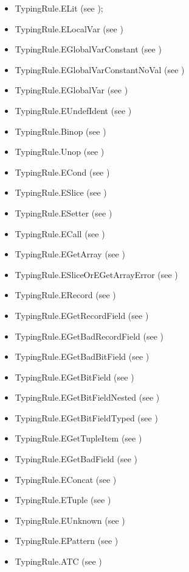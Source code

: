 \begin{itemize}
\item TypingRule.ELit (see );
\item TypingRule.ELocalVar (see )
\item TypingRule.EGlobalVarConstant (see )
\item TypingRule.EGlobalVarConstantNoVal (see )
\item TypingRule.EGlobalVar (see )
\item TypingRule.EUndefIdent (see )
\item TypingRule.Binop (see )
\item TypingRule.Unop (see )
\item TypingRule.ECond (see )
\item TypingRule.ESlice (see )
\item TypingRule.ESetter (see )
\item TypingRule.ECall (see )
\item TypingRule.EGetArray (see )
\item TypingRule.ESliceOrEGetArrayError (see )
\item TypingRule.ERecord (see )
\item TypingRule.EGetRecordField (see )
\item TypingRule.EGetBadRecordField (see )
\item TypingRule.EGetBadBitField (see )
\item TypingRule.EGetBitField (see )
\item TypingRule.EGetBitFieldNested (see )
\item TypingRule.EGetBitFieldTyped (see )
\item TypingRule.EGetTupleItem (see )
\item TypingRule.EGetBadField (see )
\item TypingRule.EConcat (see )
\item TypingRule.ETuple (see )
\item TypingRule.EUnknown (see )
\item TypingRule.EPattern (see )
\item TypingRule.ATC (see )
\end{itemize}


